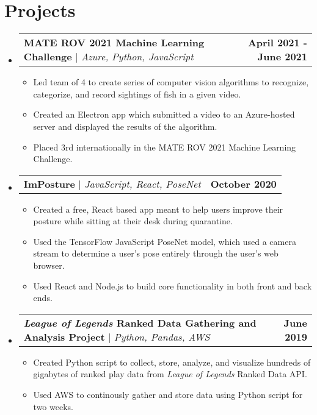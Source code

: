 \documentclass[letterpaper,11pt]{article}
\makeatletter
\newcommand{\resumeItem}[1]{
  \item\small{
    {#1 \vspace{-2pt}}
  }
}
\newcommand{\resumeProjectHeading}[2]{
    \item
    \begin{tabular*}{1.001\textwidth}{l@{\extracolsep{\fill}}r}
      \small#1 & \textbf{\small #2}\\
    \end{tabular*}\vspace{-7pt}
}
\newcommand{\resumeSubHeadingListStart}{\begin{itemize}[leftmargin=0.0in, label={}]}
\newcommand{\resumeSubHeadingListEnd}{\end{itemize}}
\newcommand{\resumeItemListStart}{\begin{itemize}}
\newcommand{\resumeItemListEnd}{\end{itemize}\vspace{-5pt}}
\makeatother
\begin{document}
\section{Projects}
    \vspace{-5pt}
    \resumeSubHeadingListStart
      \resumeProjectHeading
        {\textbf{MATE ROV 2021 Machine Learning Challenge} $|$
              \emph{Azure, Python, JavaScript}}{April 2021 - June 2021}
        \resumeItemListStart
          \resumeItem{Led team of 4 to create series of computer vision algorithms to recognize,
                      categorize, and record sightings of fish in a given video.}
          \resumeItem{Created an Electron app which submitted a video to an Azure-hosted server
                      and displayed the results of the algorithm.}
          \resumeItem{Placed 3rd internationally in the MATE ROV 2021 Machine Learning Challenge.}
        \resumeItemListEnd
        \vspace{-13pt}
      \resumeProjectHeading
          {\textbf{ImPosture} $|$ \emph{JavaScript, React, PoseNet}}{October 2020}
          \resumeItemListStart
            \resumeItem{Created a free, React based app meant to help users improve their posture
                        while sitting at their desk during quarantine.}
            \resumeItem{Used the TensorFlow JavaScript PoseNet model, which used a camera
                        stream to determine a user's pose entirely through the user's web browser.}
            \resumeItem{Used React and Node.js to build core functionality in both front and back ends.}
          \resumeItemListEnd
          \vspace{-13pt}
      \resumeProjectHeading
          {\textbf{\emph{League of Legends} Ranked Data Gathering and Analysis Project} $|$ \emph{Python, Pandas, AWS}}{June 2019}
          \resumeItemListStart
            \resumeItem{Created Python script to collect, store, analyze, and visualize hundreds
                        of gigabytes of ranked play data from \emph{League of Legends} Ranked Data API.}
            \resumeItem{Used AWS to continously gather and store data using Python script for two weeks.}
          \resumeItemListEnd
    \resumeSubHeadingListEnd
\vspace{-15pt}


%
\end{document}
